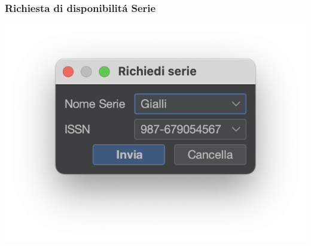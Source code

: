  \subsubsection{Richiesta di disponibilit\'a Serie}
 \includegraphics[scale=0.50, center]{Immagini/Schermate/Utente/RichiediDisponibilita.png}